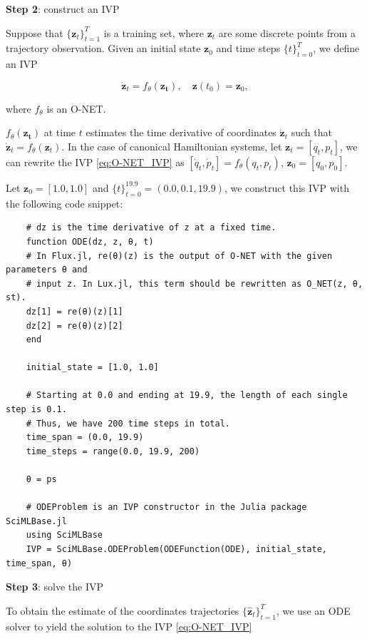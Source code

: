\documentclass[
	parskip, 			   %
	twoside, 			   %
	DIV=14, 			   %
	BCOR=15.0mm, 		   %
	headsepline, 		   %
	open=right, 		   %
	captions=tableheading, %
	bibliography=totoc,    %
	numbers=noenddot       %
]{scrreprt}
\begin{document}
\textbf{Step 2}: construct an IVP

Suppose that $\{ \mathbf{z}_{t} \}_{t=1}^{T}$ is a training set, where $\mathbf{z}_{t}$ are some discrete points from a trajectory observation. Given an initial state $\mathbf{z}_{0}$ and time steps $\{ t \}_{t=0}^{T}$, we define an IVP

\begin{equation}
    \label{eq:O-NET_IVP}
    \dot{\mathbf{z}}_t = f_{\theta}(\mathbf{z_t}), \quad \mathbf{z}(t_{0}) = \mathbf{z}_{0},
\end{equation}

where $f_{\theta}$ is an O-NET.

$f_{\theta}(\mathbf{z_t})$ at time $t$ estimates the time derivative of coordinates $\dot{\mathbf{z}}_{t}$ such that $\dot{ \mathbf{z}}_{t} = f_{\theta}(\mathbf{z}_t)$. In the case of canonical Hamiltonian systems, let $\mathbf{z}_{t} = [q_{t}, p_{t}]$, we can rewrite the IVP \ref{eq:O-NET_IVP} as $[\dot q_{t}, \dot p_{t}] = f_{\theta}(q_t, p_t)$, $\mathbf{z}_{0}= [q_{0}, p_{0}]$.

Let $\mathbf{z}_{0}=[1.0, 1.0]$ and $\{ t \}_{t=0}^{19.9} = (0.0, 0.1, 19.9)$, we construct this IVP with the following code snippet:

\begin{verbatim}
    # dz is the time derivative of z at a fixed time.
    function ODE(dz, z, θ, t)
    # In Flux.jl, re(θ)(z) is the output of O-NET with the given parameters θ and
    # input z. In Lux.jl, this term should be rewritten as O_NET(z, θ, st).
    dz[1] = re(θ)(z)[1]
    dz[2] = re(θ)(z)[2]
    end
    
    initial_state = [1.0, 1.0]
    
    # Starting at 0.0 and ending at 19.9, the length of each single step is 0.1.
    # Thus, we have 200 time steps in total.
    time_span = (0.0, 19.9)
    time_steps = range(0.0, 19.9, 200)
    
    θ = ps
    
    # ODEProblem is an IVP constructor in the Julia package SciMLBase.jl
    using SciMLBase
    IVP = SciMLBase.ODEProblem(ODEFunction(ODE), initial_state, time_span, θ)
\end{verbatim}

\textbf{Step 3}: solve the IVP

To obtain the estimate of the coordinates trajectories $\{ \mathbf{\hat{z}}_{t} \}_{t=1}^{T}$, we use an ODE solver to yield the solution to the IVP \ref{eq:O-NET_IVP}
\end{document}
